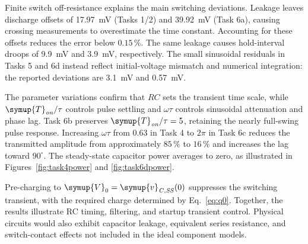 \documentclass[12pt,a4paper]{article}
\begin{document}
	Finite switch off-resistance explains the main switching deviations.
	Leakage leaves discharge offsets of \SI{17.97}{\milli\volt}
	(Tasks 1/2) and \SI{39.92}{\milli\volt} (Task 6a), causing crossing
	measurements to overestimate the time constant.  Accounting for
	these offsets reduces the error below $0.15\,\%$.  The same leakage
	causes hold-interval droops of \SI{9.9}{\milli\volt} and
	\SI{3.9}{\milli\volt}, respectively.  The small sinusoidal residuals
	in Tasks 5 and 6d instead reflect initial-voltage mismatch and
	numerical integration: the reported deviations are
	\SI{3.1}{\milli\volt} and \SI{0.57}{\milli\volt}.
	
	The parameter variations confirm that $RC$ sets the transient time
	scale, while $\symup{T}_{\mathit{on}}/\tau$ controls pulse settling and $\omega\tau$
	controls sinusoidal attenuation and phase lag.  Task 6b preserves
	$\symup{T}_{\mathit{on}}/\tau=5$, retaining the nearly full-swing pulse response.
	Increasing $\omega\tau$ from $0.63$ in Task 4 to $2\pi$ in Task 6c
	reduces the transmitted amplitude from approximately $85\,\%$ to
	$16\,\%$ and increases the lag toward $90^\circ$.
	The steady-state capacitor power averages to zero, as illustrated
	in Figures~\ref{fig:task4power} and \ref{fig:task6dpower}.
	
	Pre-charging to $\symup{V}_{0}=\symup{v}_{\mathit{C,SS}}(0)$ suppresses the switching
	transient, with the required charge determined by Eq.~\eqref{eq:q0}.
	Together, the results illustrate RC timing, filtering, and startup
	transient control.  Physical circuits would also exhibit capacitor
	leakage, equivalent series resistance, and switch-contact effects
	not included in the ideal component models.
	
\end{document}

